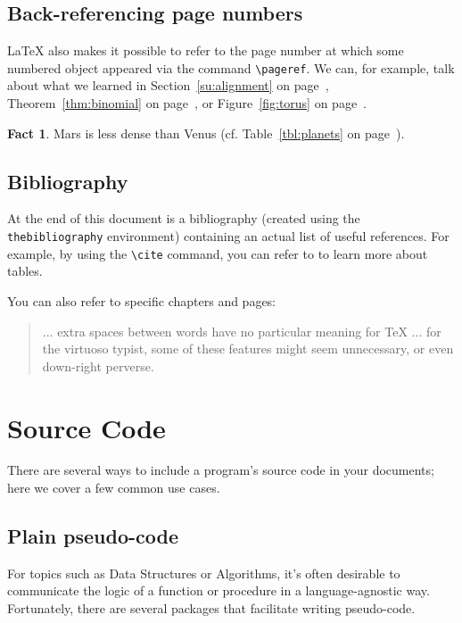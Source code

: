 \documentclass[11pt,letterpaper,titlepage]{article}
\numberwithin{equation}{section}
\numberwithin{figure}{section}
\numberwithin{table}{section}
\numberwithin{algorithm}{section}
\theoremstyle{definition}
\newtheorem{fact}[theorem]{Fact} %
\begin{document}
\subsection{Back-referencing page numbers}
{\LaTeX} also makes it possible to refer to the page number at which some numbered object appeared via the command \verb$\pageref$. We can, for example, talk about what we learned in Section~\ref{su:alignment} on page~\pageref{su:alignment}, Theorem~\ref{thm:binomial} on page~\pageref{thm:binomial}, or Figure~\ref{fig:torus} on page~\pageref{fig:torus}.

\begin{fact}
    Mars is less dense than Venus (cf. Table~\ref{tbl:planets} on page~\pageref{tbl:planets}).
\end{fact}

\subsection{Bibliography}
At the end of this document is a bibliography (created using the \verb$thebibliography$ environment) containing an actual list of useful references. For example, by using the \verb$\cite$ command, you can refer to \cite{tables} to learn more about tables.

You can also refer to specific chapters and pages:

\begin{quote}
    ... extra spaces between words have no particular meaning for {\TeX} ... for the virtuoso typist, some of these features might seem unnecessary, or even down-right perverse. \cite[chapter 1, p.~7]{joyoftex}
\end{quote}

\section{Source Code}

There are several ways to include a program's source code in your documents; here we cover a few common use cases.

\subsection{Plain pseudo-code}

For topics such as Data Structures or Algorithms, it's often desirable to communicate the logic of a function or procedure in a language-agnostic way. Fortunately, there are several packages that facilitate writing pseudo-code.
\end{document}
